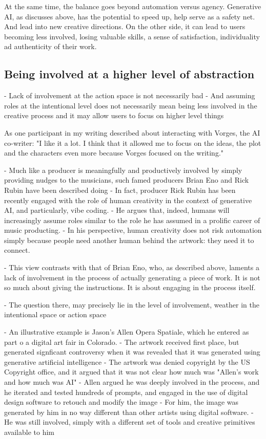 At the same time, the balance goes beyond automation versus agency. Generative AI, as discusses above, has the potential to speed up, help serve as a safety net. And lead into new creative directions. On the other side, it can lead to users becoming less involved, losing valuable skills, a sense of satisfaction, individuality ad authenticity of their work. 


\subsection{Being involved at a higher level of abstraction}


- Lack of involvement at the action space is not necessarily bad
- And assuming roles at the intentional level does not necessarily mean being less involved in the creative process and it may allow users to focus on higher level things

As one participant in my writing described about interacting with Vorges, the AI co-writer: "I like it a lot. I think that it allowed me to focus on the ideas, the plot and the characters even more because Vorges focused on the writing."

- Much like a producer is meaningfully and productively involved by simply providing nudges to the musicians, such famed producers Brian Eno and Rick Rubin have been described doing
- In fact, producer Rick Rubin has been recently engaged with the role of human creativity in the context of generative AI, and particularly, vibe coding. 
- He argues that, indeed, humans will increasingly assume roles similar to the role he has assumed in a prolific career of music producting. 
- In his perspective, human creativity does not risk automation simply because people need another human behind the artwork: they need it to connect. 

- This view contrasts with that of Brian Eno, who, as described above, laments a lack of involvement in the process of actually generating a piece of work. It is not so much about giving the instructions. It is about engaging in the process itself. 

- The question there, may precisely lie in the level of involvement, weather in the intentional space or action space

- An illustrative example is Jason's Allen Opera Spatiale, which he entered as part o a digital art fair in Colorado. 
- The artwork received first place, but generated signficant controversy when it was revealed that it was generated using generative artificial intelligence 
- The artwork was denied copyright by the US Copyright office, and it argued that it was not clear how much was "Allen's work and how much was AI"
- Allen argued he was deeply involved in the process, and he iterated and tested hundreds of prompts, and engaged in the use of digital design software to retouch and modify the image
- For him, the image was generated by him in no way different than other artists using digital software. 
- He was still involved, simply with a different set of tools and creative primitives available to him

